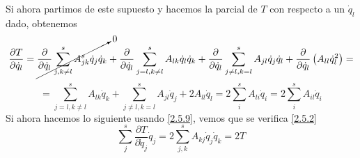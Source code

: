 Si ahora partimos de este supuesto y hacemos la parcial de $T$ con respecto a un $\dot{q}_l$ dado, obtenemos
\[\frac{\partial T}{\partial \dot{q}_l} = \cancelto{0}{\frac{\partial}{\partial \dot{q}_l} \sum_{j,k\neq l}^s{A_{jk}^s\dot{q}_j\dot{q}_k}}+\frac{\partial}{\partial \dot{q}_l} \sum_{j=l, k\neq l}^s{A_{lk}\dot{q}_l\dot{q}_k} + \frac{\partial}{\partial \dot{q}_l} \sum_{j\neq l, k = l}^s A_{jl}\dot{q}_j\dot{q}_l + \frac{\partial}{\partial \dot{q}_l} \left(A_{ll} \dot{q}_l^2\right) = \]
\begin{equation} \label{2.5.9}
    =\sum_{j=l, k\neq l}^s{A_{lk}\dot{q}_k} + \sum_{j\neq l, k = l}^s{A_{jl}\dot{q}_j} + 2A_{ll} \dot{q}_l =2 \sum_i^s A_{li} \dot{q}_i=2 \sum_i^s A_{il} \dot{q}_i
\end{equation} 
Si ahora hacemos lo siguiente usando \eqref{2.5.9}, vemos que se verifica \eqref{2.5.2}
\begin{equation} \label{2.5.10}
    \sum_j^s \frac{\partial T}{\partial \dot{q}_j} \dot{q}_j = 2 \sum_{j,k}^s{A_{kj}\dot{q}_j\dot{q}_k=2 T}
\end{equation} 

